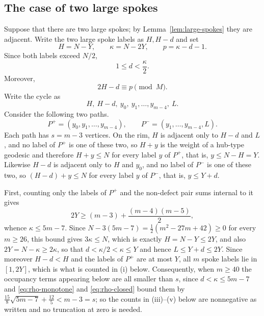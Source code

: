 \documentclass[11pt]{article}
\theoremstyle{definition}
\theoremstyle{remark}
\numberwithin{equation}{section}
\begin{document}
\subsection{The case of two large spokes}

Suppose that there are two large spokes; by Lemma~\ref{lem:large-spokes} they are adjacent. Write the two large spoke labels as $H,H-d$ and set
\[
  H=N-Y,\qquad
  \kappa=N-2Y,\qquad
  p=\kappa-d-1.
\]
Since both labels exceed $N/2$,
\[
  1\le d<\frac\kappa2.
\]
Moreover,
\begin{equation}\label{eq:phase-index-p}
  2H-d\equiv p\pmod M.
\end{equation}
Write the cycle as
\[
  H,\ H-d,\ y_0,\ y_1,\ldots,y_{m-4},\ L.
\]
Consider the following two paths.
\[
  P^+=(y_0,y_1,\ldots,y_{m-4}),
  \qquad
  P^-=(y_1,\ldots,y_{m-4},L).
\]
Each path has $s=m-3$ vertices. On the rim, $H$ is adjacent only to $H-d$ and $L$, and no label of $P^+$ is one of these two, so $H+y$ is the weight of a hub-type geodesic and therefore $H+y\le N$ for every label $y$ of $P^+$, that is, $y\le N-H=Y$. Likewise $H-d$ is adjacent only to $H$ and $y_0$, and no label of $P^-$ is one of these two, so $(H-d)+y\le N$ for every label $y$ of $P^-$, that is, $y\le Y+d$.

First, counting only the labels of $P^+$ and the non-defect pair sums internal to it gives
\[
  2Y\ge (m-3)+\frac{(m-4)(m-5)}2,
\]
whence $\kappa\le5m-7$. Since $N-3(5m-7)=\tfrac12(m^2-27m+42)\ge0$ for every $m\ge26$, this bound gives $3\kappa\le N$, which is exactly $H=N-Y\le2Y$, and also $2Y=N-\kappa\ge2\kappa$, so that $d<\kappa/2<\kappa\le Y$ and hence $L\le Y+d\le2Y$. Since moreover $H-d<H$ and the labels of $P^+$ are at most $Y$, all $m$ spoke labels lie in $[1,2Y]$, which is what is counted in (i) below. Consequently, when $m\ge40$ the occupancy terms appearing below are all smaller than $s$, since $d<\kappa\le5m-7$ and \eqref{eq:rho-monotone} and \eqref{eq:rho-closed} bound them by $\tfrac{15}8\sqrt{5m-7}+\tfrac{12}5<m-3=s$; so the counts in (iii)--(v) below are nonnegative as written and no truncation at zero is needed.
\end{document}
